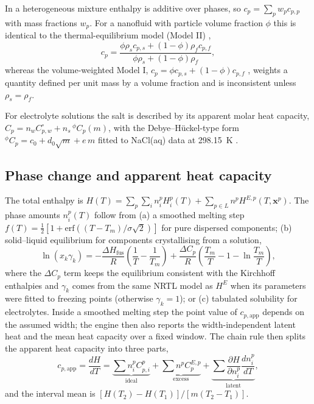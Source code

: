 \documentclass[journal=jceaax,manuscript=article,layout=twocolumn]{achemso}
\begin{document}
In a heterogeneous mixture enthalpy is additive over phases, so $c_p=\sum_p w_p c_{p,p}$ with mass
fractions $w_p$. For a nanofluid with particle volume fraction $\phi$ this is identical to the
thermal-equilibrium model (Model II) \cite{Xuan2000},
\begin{equation}
c_p=\frac{\phi\rho_s c_{p,s}+(1-\phi)\rho_f c_{p,f}}{\phi\rho_s+(1-\phi)\rho_f},
\end{equation}
whereas the volume-weighted Model I, $c_p=\phi c_{p,s}+(1-\phi)c_{p,f}$ \cite{Pak1998}, weights a quantity
defined per unit mass by a volume fraction and is inconsistent unless $\rho_s=\rho_f$.

For electrolyte solutions the salt is described by its apparent molar heat capacity,
$C_p=n_wC_{p,w}^\circ+n_s\,{}^\phi C_p(m)$, with the Debye--H\"uckel-type form
${}^\phi C_p=c_0+d_0\sqrt{m}+e\,m$ fitted to NaCl(aq) data at 298.15~K \cite{Tromans2005}.

\subsection{Phase change and apparent heat capacity}
The total enthalpy is $H(T)=\sum_p\sum_i n_i^pH_i^p(T)+\sum_{p\in L}n^pH^{E,p}(T,\mathbf{x}^p)$. The phase
amounts $n_i^p(T)$ follow from (a) a smoothed melting step
$f(T)=\tfrac12[1+\mathrm{erf}((T-T_m)/\sigma\sqrt2)]$ for pure dispersed components; (b) solid--liquid
equilibrium for components crystallising from a solution,
\begin{equation}
\ln(x_k\gamma_k)=-\frac{\Delta H_\mathrm{fus}}{R}\left(\frac1T-\frac1{T_m}\right)
+\frac{\Delta C_p}{R}\left(\frac{T_m}{T}-1-\ln\frac{T_m}{T}\right),
\label{eq:sle}
\end{equation}
where the $\Delta C_p$ term keeps the equilibrium consistent with the Kirchhoff enthalpies and
$\gamma_k$ comes from the same NRTL model as $H^E$ when its parameters were fitted to freezing points
(otherwise $\gamma_k=1$); or (c) tabulated solubility for electrolytes. Inside a smoothed melting step the
point value of $c_{p,\mathrm{app}}$ depends on the assumed width; the engine then also reports the
width-independent latent heat and the mean heat capacity over a fixed window. The chain rule then splits the apparent heat capacity into three parts,
\begin{equation}
c_{p,\mathrm{app}}=\frac{dH}{dT}=\underbrace{\sum n_i^pC_{p,i}^p}_{\text{ideal}}
+\underbrace{\sum n^pC_p^{E,p}}_{\text{excess}}
+\underbrace{\sum \frac{\partial H}{\partial n_i^p}\frac{dn_i^p}{dT}}_{\text{latent}},
\end{equation}
and the interval mean is $[H(T_2)-H(T_1)]/[m(T_2-T_1)]$.
\end{document}
